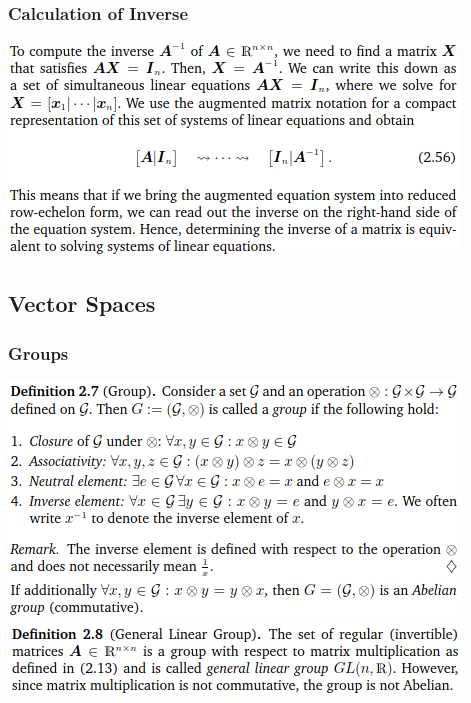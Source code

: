 \documentclass[oneside]{article}
\begin{document}
\begin{multicols}{2}
\subsubsection*{Calculation of Inverse}
\includegraphics[width=\linewidth]{2.3_4}


\subsection{Vector Spaces}

\subsubsection*{Groups}
\includegraphics[width=\linewidth]{2.4}
\includegraphics[width=\linewidth]{2.4_1}


\end{multicols}
\end{document}
